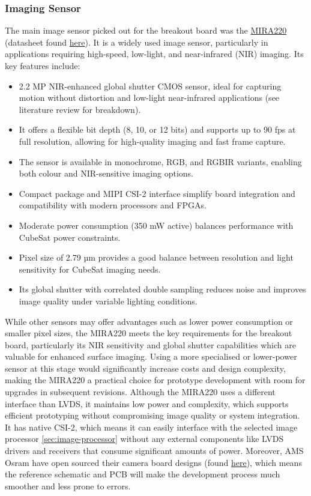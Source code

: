 \documentclass[10pt]{article}
\newcommand{\nl}{\newline \newline}
\begin{document}
\subsubsection{Imaging Sensor}
The main image sensor picked out for the breakout board was the \href{https://ams-osram.com/products/sensor-solutions/cmos-image-sensors/ams-mira220}{MIRA220} (datasheet found \href{https://look.ams-osram.com/m/7591efdbe4af32dc/original/Mira220-1-2-7-2-2-MP-NIR-enhanced-global-shutter-image-sensor.pdf}{here}).
It is a widely used image sensor, particularly in applications requiring high-speed, low-light, and near-infrared (NIR) imaging. Its key features include:
\begin{itemize}
\item 2.2 MP NIR-enhanced global shutter CMOS sensor, ideal for capturing motion without distortion and low-light near-infrared applications (see literature review for breakdown).
\item It offers a flexible bit depth (8, 10, or 12 bits) and supports up to 90 fps at full resolution, allowing for high-quality imaging and fast frame capture.
\item The sensor is available in monochrome, RGB, and RGBIR variants, enabling both colour and NIR-sensitive imaging options.
\item Compact package and MIPI CSI-2 interface simplify board integration and compatibility with modern processors and FPGAs.
\item Moderate power consumption (350 mW active) balances performance with CubeSat power constraints.
\item Pixel size of 2.79 µm provides a good balance between resolution and light sensitivity for CubeSat imaging needs.
\item Its global shutter with correlated double sampling reduces noise and improves image quality under variable lighting conditions.
\end{itemize}
While other sensors may offer advantages such as lower power consumption or smaller pixel sizes, the MIRA220 meets the key requirements for the breakout board, particularly its NIR sensitivity and global shutter capabilities which are valuable for enhanced surface imaging.
Using a more specialised or lower-power sensor at this stage would significantly increase costs and design complexity, making the MIRA220 a practical choice for prototype development with room for upgrades in subsequent revisions.
\nl
Although the MIRA220 uses a different interface than LVDS, it maintains low power and complexity, which supports efficient prototyping without compromising image quality or system integration.
It has native CSI-2, which means it can easily interface with the selected image processor \autoref{sec:image-processor} without any external components like LVDS drivers and receivers that consume significant amounts of power. Moreover, AMS Osram have open sourced their camera board designs (found \href{https://github.com/ams-OSRAM/MIRA_camera_rpi/tree/main}{here}), which means the reference schematic and PCB will make the development process much smoother and less prone to errors.
\end{document}

